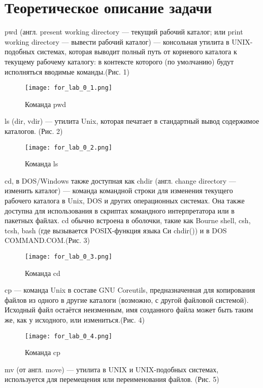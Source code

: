 \documentclass[a4paper,14pt]{extarticle}
\begin{document}
\section{Теоретическое описание задачи}
pwd (англ. present working directory — текущий рабочий каталог; или print working directory — вывести рабочий каталог) — консольная утилита в UNIX-подобных системах, которая выводит полный путь от корневого каталога к текущему рабочему каталогу: в контексте которого (по умолчанию) будут исполняться вводимые команды.(Рис. 1)

\begin{figure}[h]

\centering
\texttt{[image: for\_lab\_0\_1.png]}
\caption{Команда pwd}
\label{fig:mpr}
\end{figure}

ls (dir, vdir) — утилита Unix, которая печатает в стандартный вывод содержимое каталогов. (Рис. 2)

\begin{figure}[h]
\centering
\texttt{[image: for\_lab\_0\_2.png]}
\caption{Команда ls}
\label{fig:mpr}
\end{figure}

cd, в DOS/Windows также доступная как chdir (англ. change directory — изменить каталог) — команда командной строки для изменения текущего рабочего каталога в Unix, DOS и других операционных системах. Она также доступна для использования в скриптах командного интерпретатора или в пакетных файлах. cd обычно встроена в оболочки, такие как Bourne shell, csh, tcsh, bash (где вызывается POSIX-функция языка Си chdir()) и в DOS COMMAND.COM.(Рис. 3)

\begin{figure}[h]
\centering
\texttt{[image: for\_lab\_0\_3.png]}
\caption{Команда cd}
\label{fig:mpr}
\end{figure}

cp — команда Unix в составе GNU Coreutils, предназначенная для копирования файлов из одного в другие каталоги (возможно, с другой файловой системой). Исходный файл остаётся неизменным, имя созданного файла может быть таким же, как у исходного, или измениться.(Рис. 4)

\begin{figure}[h]
\centering
\texttt{[image: for\_lab\_0\_4.png]}
\caption{Команда cp}
\label{fig:mpr}
\end{figure}

mv (от англ. move) — утилита в UNIX и UNIX-подобных системах, используется для перемещения или переименования файлов. (Рис. 5)
\end{document}
